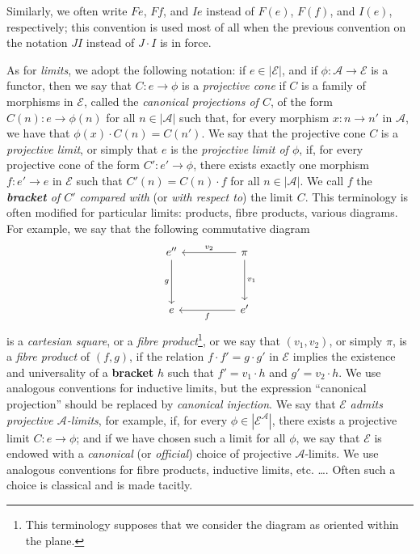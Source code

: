 \documentclass[fleqn]{article}
\newcommand{\oldpage}[1]{\marginpar{\footnotesize$\Big\vert$ \textit{p.~#1}}}
\newcommand{\unsure}[1]{{\color{purple}\textbf{#1}}}
\newcommand{\cat}[1]{\mathcal{#1}}
\newcommand{\set}[1]{|#1|}
\begin{document}
Similarly, we often write $Fe$, $Ff$, and $Ie$ instead of $F(e)$, $F(f)$, and $I(e)$, respectively; this convention is used most of all when the previous convention on the notation $JI$ instead of $J\cdot I$ is in force.

As for \emph{limits}, we adopt the following notation: if $e\in\set{\cat{E}}$, and if $\phi\colon \cat{A}\to\cat{E}$ is a functor, then we say that $C\colon e\to\phi$ is a \emph{projective cone} if $C$ is a family of morphisms in $\cat{E}$, called the \emph{canonical projections of $C$}, of the form $C(n)\colon e\to\phi(n)$ for all $n\in\set{\cat{A}}$ such that, for every morphism $x\colon n\to n'$ in $\cat{A}$, we have that $\phi(x)\cdot C(n)=C(n')$.
We say that the projective cone $C$ is a \emph{projective limit}, or simply that $e$ is the \emph{projective limit of $\phi$}, if, for every projective cone of the form $C'\colon e'\to\phi$, there exists exactly one morphism $f\colon e'\to e$ in $\cat{E}$ such that $C'(n)=C(n)\cdot f$ for all $n\in\set{\cat{A}}$.
We call $f$ the \emph{\unsure{bracket} of $C'$ compared with} (or \emph{with respect to}) the limit $C$.
This terminology is often modified for particular limits: products, fibre products, various diagrams.
For example, we say that the following commutative diagram
\oldpage{222}
\[
  \begin{tikzcd}[sep=huge]
    e'' \ar[d,swap,"g"]
  & \pi \ar[l,swap,"v_2"] \ar[d,"v_1"]
  \\e
  & e' \ar[l,"f"]
  \end{tikzcd}
\]
is a \emph{cartesian square}, or a \emph{fibre product}\footnote{This terminology supposes that we consider the diagram as oriented within the plane.}, or we say that $(v_1,v_2)$, or simply $\pi$, is a \emph{fibre product} of $(f,g)$, if the relation $f\cdot f'=g\cdot g'$ in $\cat{E}$ implies the existence and universality of a \unsure{bracket} $h$ such that $f'=v_1\cdot h$ and $g'=v_2\cdot h$.
We use analogous conventions for inductive limits, but the expression ``canonical projection''  should be replaced by \emph{canonical injection}.
We say that $\cat{E}$ \emph{admits projective $\cat{A}$-limits}, for example, if, for every $\phi\in\set{\cat{E}^\cat{A}}$, there exists a projective limit $C\colon e\to\phi$;
and if we have chosen such a limit for all $\phi$, we say that $\cat{E}$ is endowed with a \emph{canonical} (or \emph{official}) choice of projective $\cat{A}$-limits.
We use analogous conventions for fibre products, inductive limits, etc. \ldots.
Often such a choice is classical and is made tacitly.
\end{document}

